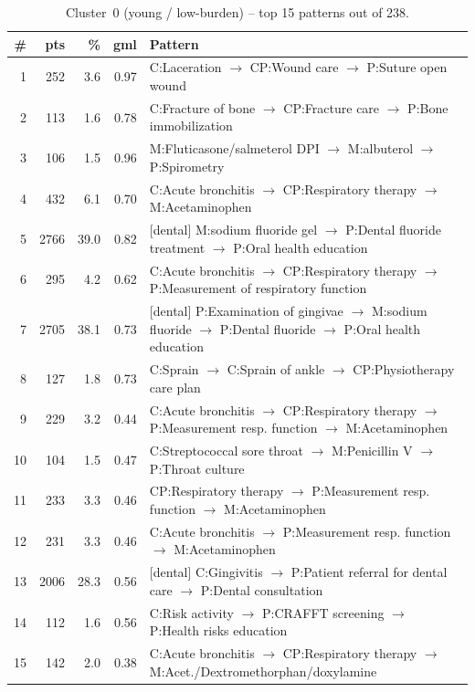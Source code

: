 \begin{table}[H]
\centering
\footnotesize
\setlength{\arraystretch}{1.05}
\begin{tabular}{@{}r r r r p{9.5cm}@{}}
\toprule
\# & pts & \% & gml & Pattern \\
\midrule
1  &  252 &  3.6 & 0.97 & C:Laceration $\to$ CP:Wound care $\to$ P:Suture open wound \\
2  &  113 &  1.6 & 0.78 & C:Fracture of bone $\to$ CP:Fracture care $\to$ P:Bone immobilization \\
3  &  106 &  1.5 & 0.96 & M:Fluticasone/salmeterol DPI $\to$ M:albuterol $\to$ P:Spirometry \\
4  &  432 &  6.1 & 0.70 & C:Acute bronchitis $\to$ CP:Respiratory therapy $\to$ M:Acetaminophen \\
5  & 2766 & 39.0 & 0.82 & [dental] M:sodium fluoride gel $\to$ P:Dental fluoride treatment $\to$ P:Oral health education \\
6  &  295 &  4.2 & 0.62 & C:Acute bronchitis $\to$ CP:Respiratory therapy $\to$ P:Measurement of respiratory function \\
7  & 2705 & 38.1 & 0.73 & [dental] P:Examination of gingivae $\to$ M:sodium fluoride $\to$ P:Dental fluoride $\to$ P:Oral health education \\
8  &  127 &  1.8 & 0.73 & C:Sprain $\to$ C:Sprain of ankle $\to$ CP:Physiotherapy care plan \\
9  &  229 &  3.2 & 0.44 & C:Acute bronchitis $\to$ CP:Respiratory therapy $\to$ P:Measurement resp. function $\to$ M:Acetaminophen \\
10 &  104 &  1.5 & 0.47 & C:Streptococcal sore throat $\to$ M:Penicillin V $\to$ P:Throat culture \\
11 &  233 &  3.3 & 0.46 & CP:Respiratory therapy $\to$ P:Measurement resp. function $\to$ M:Acetaminophen \\
12 &  231 &  3.3 & 0.46 & C:Acute bronchitis $\to$ P:Measurement resp. function $\to$ M:Acetaminophen \\
13 & 2006 & 28.3 & 0.56 & [dental] C:Gingivitis $\to$ P:Patient referral for dental care $\to$ P:Dental consultation \\
14 &  112 &  1.6 & 0.56 & C:Risk activity $\to$ P:CRAFFT screening $\to$ P:Health risks education \\
15 &  142 &  2.0 & 0.38 & C:Acute bronchitis $\to$ CP:Respiratory therapy $\to$ M:Acet./Dextromethorphan/doxylamine \\
\bottomrule
\end{tabular}
\caption{Cluster~0 (young / low-burden) -- top 15 patterns out of 238.}
\label{tab:ch6_seq_c0}
\end{table}

